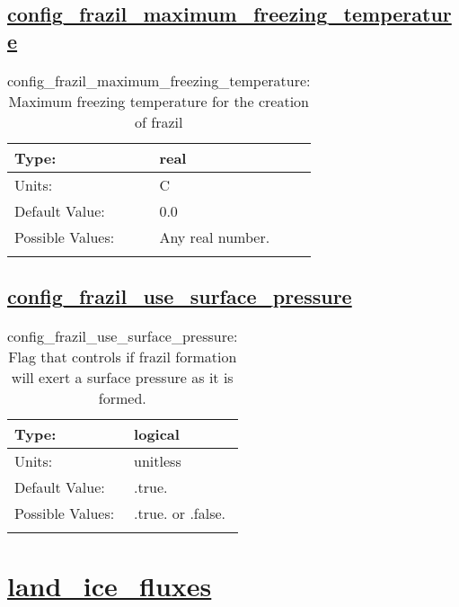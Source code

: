 \subsection[config\_frazil\_maximum\_freezing\_temperature]{\hyperref[sec:nm_tab_frazil_ice]{config\_frazil\_maximum\_freezing\_temperature}}
\label{subsec:nm_sec_config_frazil_maximum_freezing_temperature}
\begin{center}
\begin{longtable}{| p{2.0in} || p{4.0in} |}
    \hline
    Type: & real \\
    \hline
    Units: & \si{C} \\
    \hline
    Default Value: & 0.0 \\
    \hline
    Possible Values: & Any real number. \\
    \hline
    \caption{config\_frazil\_maximum\_freezing\_temperature: Maximum freezing temperature for the creation of frazil}
\end{longtable}
\end{center}
\subsection[config\_frazil\_use\_surface\_pressure]{\hyperref[sec:nm_tab_frazil_ice]{config\_frazil\_use\_surface\_pressure}}
\label{subsec:nm_sec_config_frazil_use_surface_pressure}
\begin{center}
\begin{longtable}{| p{2.0in} || p{4.0in} |}
    \hline
    Type: & logical \\
    \hline
    Units: & \si{unitless} \\
    \hline
    Default Value: & .true. \\
    \hline
    Possible Values: & .true. or .false. \\
    \hline
    \caption{config\_frazil\_use\_surface\_pressure: Flag that controls if frazil formation will exert a surface pressure as it is formed.}
\end{longtable}
\end{center}
\section[land\_ice\_fluxes]{\hyperref[sec:nm_tab_land_ice_fluxes]{land\_ice\_fluxes}}
\label{sec:nm_sec_land_ice_fluxes}
